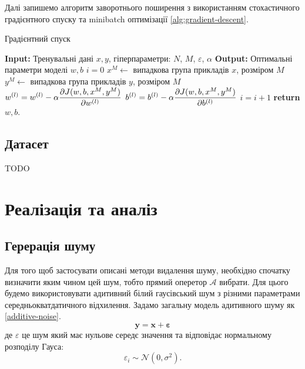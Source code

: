 \documentclass[14pt,a4paper]{extarticle}
\renewcommand{\algorithmicrequire}{\textbf{Input: }}
\renewcommand{\algorithmicensure}{\textbf{Output: }}
\newcommand{\algorithmreturn}{\textbf{return }}
\newcounter{e}
\numberwithin{equation}{section}
\numberwithin{figure}{section}
\begin{document}
	Далі запишемо алгоритм заворотнього поширення з використанням стохастичного градієнтного спуску та minibatch оптимізації \ref{alg:gradient-descent}.
	\begin{algorithm}[H]
		\caption{Градієнтний спуск}
		\label{alg:gradient-descent}
		\begin{algorithmic}[1]
			\State \algorithmicrequire{Тренувальні дані $x, y$, гіперпараметри: $N$, $M$, $\varepsilon$, $\alpha$}
			\State \algorithmicensure{ Оптимальні параметри моделі $w, b$}
			\State $i = 0$
			\State $x^M \leftarrow$ випадкова група прикладів $x$, розміром $M$
			\State $y^M \leftarrow$ випадкова група прикладів $y$, розміром $M$
			\State $\displaystyle w^{(l)} = w^{(l)} -  \alpha \pdv{J(w, b, x^M, y^M)}{w^{(l)}}$
			\vspace{0.2cm}
			\State $\displaystyle b^{(l)} = b^{(l)} - \alpha \pdv{J(w, b, x^M, y^M)}{b^{(l)}}$
			\State $\displaystyle i = i + 1$
			\EndFor
			\EndWhile
			\State \algorithmreturn{$w, b$}.
		\end{algorithmic}
	\end{algorithm}

	\subsection{Датасет}
	TODO
	
	\newpage
	\thispagestyle{empty}
	\section{Реалізація та аналіз}
	
	\subsection{Герерація шуму}	
	Для того щоб застосувати описані методи видалення шуму, необхідно спочатку визначити яким чином цей шум, тобто прямий оперетор $\mathcal{A}$ вибрати. Для цього будемо використовувати адитивний білий гаусівський шум з різними параметрами середньокватдатичного відхилення. Задамо загальну модель адитивного шуму як \ref{additive-noise}.
	\begin{equation}
		\label{additive-noise}
		\mathbf{y}=\mathbf{x} + \mathbf{\varepsilon}
	\end{equation}
	де $\varepsilon$ це шум який має нульове середє значення та відповідає нормальному розподілу Гауса:
	\begin{equation}
		\varepsilon_{i} \sim \mathcal{N}\left(0, \sigma^{2}\right) .
	\end{equation}
	
\end{document}
